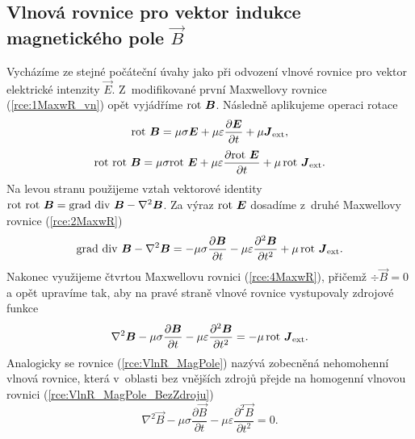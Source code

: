 \subsection{Vlnová rovnice pro vektor indukce magnetického pole $\vec B$}
Vycházíme ze stejné počáteční úvahy jako při odvození vlnové rovnice pro vektor elektrické intenzity $\vec E$. Z~modifikované první Maxwellovy rovnice (\ref{rce:1MaxwR_vn}) opět vyjádříme $\mathrm{rot}\  \mbox{\boldmath$B$}$. Následně aplikujeme operaci rotace
\begin{displaymath}
	\mathrm{rot}\ \mbox{\boldmath$B$} = \mu\sigma\mbox{\boldmath$E$}+\mu\varepsilon\frac{\partial\mbox{\boldmath$E$}}{\partial t}+\mu\mbox{\boldmath$J$}_{\mathrm{ext}},
\end{displaymath}
\begin{displaymath}
	\mathrm{rot}\ \mathrm{rot}\ \mbox{\boldmath$B$} = \mu\sigma\mathrm{rot}\ \mbox{\boldmath$E$}+\mu\varepsilon\frac{\partial \mathrm{rot}\ \mbox{\boldmath$E$}}{\partial t}+\mu\,\mathrm{rot}\ \mbox{\boldmath$J$}_{\mathrm{ext}}.
\end{displaymath}
Na levou stranu použijeme vztah vektorové identity $\mathrm{rot}\ \mathrm{rot}\ \mbox{\boldmath$B$} = \mathrm{grad}\ \mathrm{div}\ \mbox{\boldmath$B$} - \nabla^{2}\mbox{\boldmath$B$}$. Za výraz $\mathrm{rot}\  \mbox{\boldmath$E$}$ dosadíme z~druhé Maxwellovy rovnice (\ref{rce:2MaxwR}) 
\begin{displaymath}
	\mathrm{grad}\ \mathrm{div}\ \mbox{\boldmath$B$} - \nabla^{2}\mbox{\boldmath$B$} = -\mu\sigma\frac{\partial\mbox{\boldmath$B$}}{\partial t}-\mu\varepsilon\frac{\partial^{2}\mbox{\boldmath$B$}}{\partial t^{2}}+\mu\,\mathrm{rot}\ \mbox{\boldmath$J$}_{\mathrm{ext}}.
\end{displaymath}
Nakonec využijeme čtvrtou Maxwellovu rovnici (\ref{rce:4MaxwR}), přičemž $\div \vec B = 0$ a opět upravíme tak, aby na pravé straně vlnové rovnice vystupovaly zdrojové funkce
\begin{equation}
	\nabla^{2}\mbox{\boldmath$B$} -\mu\sigma\frac{\partial\mbox{\boldmath$B$}}{\partial t}-\mu\varepsilon\frac{\partial^{2}\mbox{\boldmath$B$}}{\partial t^{2}}= -\mu\,\mathrm{rot}\ \mbox{\boldmath$J$}_{\mathrm{ext}}.
	\label{rce:VlnR_MagPole}
\end{equation}
Analogicky se rovnice (\ref{rce:VlnR_MagPole}) nazývá zobecněná nehomohenní vlnová rovnice, která v~oblasti bez vnějších zdrojů přejde na homogenní vlnovou rovnici (\ref{rce:VlnR_MagPole_BezZdroju})
\begin{equation}
	\nabla^{2}\vec B -\mu\sigma\frac{\partial\vec B}{\partial t}-\mu\varepsilon\frac{\partial^{2}\vec B}{\partial t^{2}}= 0.
	\label{rce:VlnR_MagPole_BezZdroju}
\end{equation}

